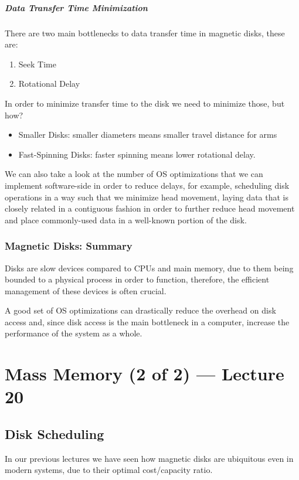 \documentclass[openright, twoside]{report}
\theoremstyle{definition}
\theoremstyle{example}
\begin{document}
\paragraph{Data Transfer Time Minimization}
There are two main bottlenecks to data transfer time in magnetic disks, these are:

\begin{enumerate}
	\item Seek Time
	\item Rotational Delay
\end{enumerate}

In order to minimize transfer time to the disk we need to minimize those, but how?

\begin{itemize}
	\item Smaller Disks: smaller diameters means smaller travel distance for arms
	\item Fast-Spinning Disks: faster spinning means lower rotational delay.
\end{itemize}

We can also take a look at the number of OS optimizations that we can implement
software-side in order to reduce delays, for example, scheduling disk operations 
in a way such that we minimize head movement, laying data that is closely related in 
a contiguous fashion in order to further reduce head movement and place commonly-used 
data in a well-known portion of the disk.

\subsection{Magnetic Disks: Summary}
Disks are slow devices compared to CPUs and main memory, due to them being
bounded to a physical process in order to function, therefore, the efficient 
management of these devices is often crucial.

A good set of OS optimizations can drastically reduce the overhead on disk access
and, since disk access is the main bottleneck in a computer, increase the performance
of the system as a whole.

\chapter{Mass Memory (2 of 2) --- Lecture 20}
\section{Disk Scheduling}
In our previous lectures we have seen how magnetic disks are ubiquitous 
even in modern systems, due to their optimal cost/capacity ratio.
\end{document}
